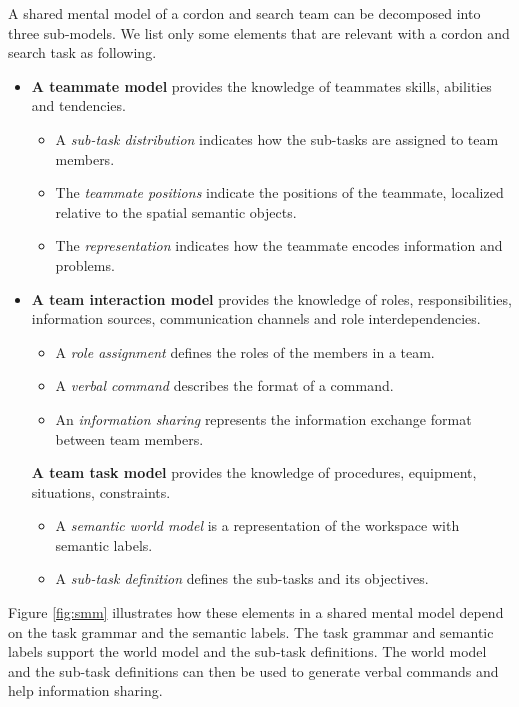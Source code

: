 A shared mental model of a cordon and search team can be decomposed \cite{goodrich2013toward} into three sub-models.
We list only some elements that are relevant with a cordon and search task as following.
\begin{itemize}
\item
\textbf{A teammate model} provides the knowledge of teammates skills, abilities and tendencies.
\begin{itemize}
\item A \emph{sub-task distribution} indicates how the sub-tasks are assigned to team members.
\item The \emph{teammate positions} indicate the positions of the teammate, localized relative to the spatial semantic objects.
\item The \emph{representation} indicates how the teammate encodes information and problems.
\end{itemize}
\item 
\textbf{A team interaction model} provides the knowledge of roles, responsibilities, information sources, communication channels and role interdependencies.
\begin{itemize}
\item A \emph{role assignment} defines the roles of the members in a team.
\item A \emph{verbal command} describes the format of a command.
\item An \emph{information sharing} represents the information exchange format between team members.
\end{itemize}  
\textbf{A team task model} provides the knowledge of procedures, equipment, situations, constraints.
\begin{itemize}
\item A \emph{semantic world model} is a representation of the workspace with semantic labels.
\item A \emph{sub-task definition} defines the sub-tasks and its objectives.
\end{itemize}
\end{itemize}

Figure \ref{fig:smm} illustrates how these elements in a shared mental model depend on the task grammar and the semantic labels.
The task grammar and semantic labels support the world model and the sub-task definitions.
The world model and the sub-task definitions can then be used to generate verbal commands and help information sharing.


